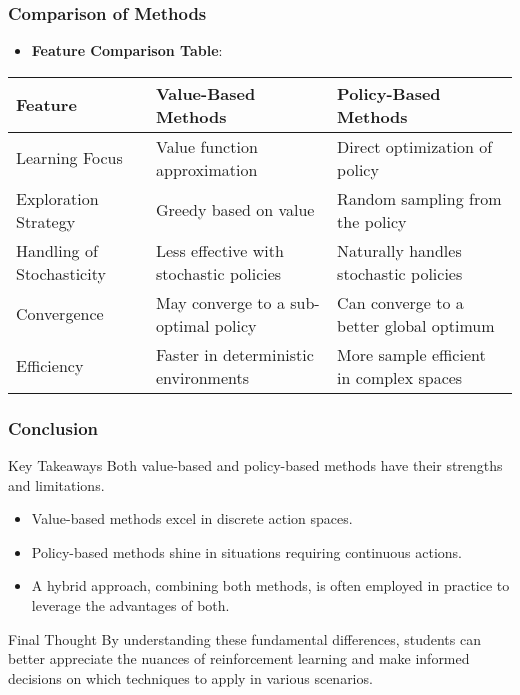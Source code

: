 \documentclass[aspectratio=169]{beamer}
\begin{document}
\begin{frame}[fragile]
    \frametitle{Comparison of Methods}
    \begin{itemize}
        \item \textbf{Feature Comparison Table}:
        \end{itemize}
        \begin{center}
            \begin{tabular}{|l|l|l|}
            \hline
            Feature & Value-Based Methods & Policy-Based Methods \\
            \hline
            Learning Focus & Value function approximation & Direct optimization of policy \\
            \hline
            Exploration Strategy & Greedy based on value & Random sampling from the policy \\
            \hline
            Handling of Stochasticity & Less effective with stochastic policies & Naturally handles stochastic policies \\
            \hline
            Convergence & May converge to a sub-optimal policy & Can converge to a better global optimum \\
            \hline
            Efficiency & Faster in deterministic environments & More sample efficient in complex spaces \\
            \hline
            \end{tabular}
        \end{center}
\end{frame}

\begin{frame}[fragile]
    \frametitle{Conclusion}
    \begin{block}{Key Takeaways}
        Both value-based and policy-based methods have their strengths and limitations. 
        \begin{itemize}
            \item Value-based methods excel in discrete action spaces.
            \item Policy-based methods shine in situations requiring continuous actions.
            \item A hybrid approach, combining both methods, is often employed in practice to leverage the advantages of both.
        \end{itemize}
    \end{block}
    \begin{block}{Final Thought}
        By understanding these fundamental differences, students can better appreciate the nuances of reinforcement learning and make informed decisions on which techniques to apply in various scenarios.
    \end{block}
\end{frame}
\end{document}
